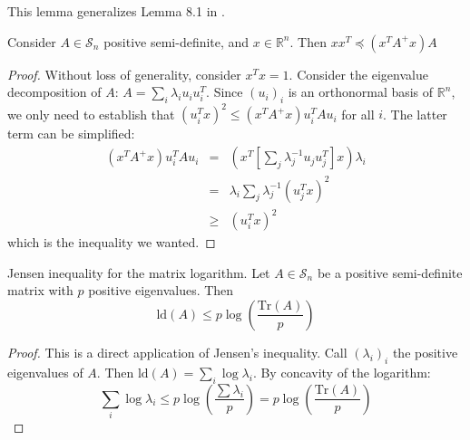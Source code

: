 This lemma generalizes Lemma 8.1 in \cite{Spielman2009a}. 
\begin{lemma}
\label{lem:simple-inequality}Consider $A\in\mathcal{S}_{n}$ positive
semi-definite, and $x\in\mathbb{R}^{n}$. Then $xx^{T}\preceq\left(x^{T}A^{+}x\right)A$\end{lemma}
\begin{proof}
Without loss of generality, consider $x^{T}x=1$. Consider the eigenvalue
decomposition of $A$: $A=\sum_{i}\lambda_{i}u_{i}u_{i}^{T}$. Since
$\left(u_{i}\right)_{i}$ is an orthonormal basis of $\mathbb{R}^{n}$,
we only need to establish that $\left(u_{i}^{T}x\right)^{2}\leq\left(x^{T}A^{+}x\right)u_{i}^{T}Au_{i}$
for all $i$. The latter term can be simplified: 
\begin{eqnarray*}
\left(x^{T}A^{+}x\right)u_{i}^{T}Au_{i} & = & \left(x^{T}\left[\sum_{j}\lambda_{j}^{-1}u_{j}u_{j}^{T}\right]x\right)\lambda_{i}\\
 & = & \lambda_{i}\sum_{j}\lambda_{j}^{-1}\left(u_{j}^{T}x\right)^{2}\\
 & \geq & \left(u_{i}^{T}x\right)^{2}
\end{eqnarray*}
which is the inequality we wanted.\end{proof}
\begin{lemma}
\label{lem:Jensen-inequality-matrix-logarithm-1}Jensen inequality
for the matrix logarithm. Let $A\in\mathcal{S}_{n}$ be a positive
semi-definite matrix with $p$ positive eigenvalues. Then 
\[
\text{ld}\left(A\right)\leq p\log\left(\frac{\text{Tr}\left(A\right)}{p}\right)
\]
\end{lemma}
\begin{proof}
This is a direct application of Jensen's inequality. Call $\left(\lambda_{i}\right)_{i}$
the positive eigenvalues of $A$. Then $\text{ld}\left(A\right)=\sum_{i}\log\lambda_{i}$.
By concavity of the logarithm: 
\[
\sum_{i}\log\lambda_{i}\leq p\log\left(\frac{\sum\lambda_{i}}{p}\right)=p\log\left(\frac{\text{Tr}\left(A\right)}{p}\right)
\]
\end{proof}

